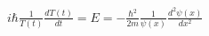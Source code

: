 \documentclass[preview]{standalone}
\begin{document}
\begin{center}
$i\hbar \frac{1}{T(t)} \frac{dT(t)}{dt} = E = -\frac{\hbar^2}{2m} \frac{1}{\psi(x)} \frac{d^2 \psi(x)}{dx^2} $
\end{center}
\end{document}
